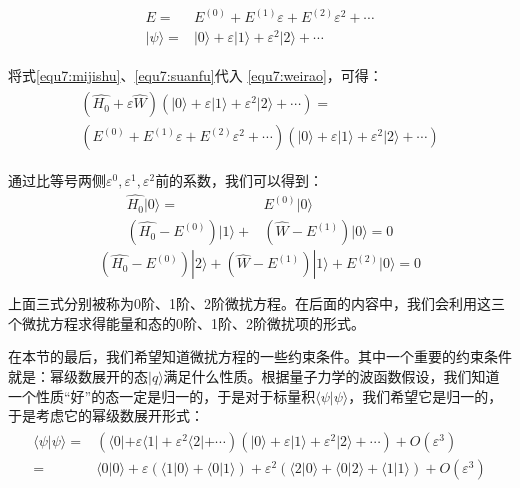     \begin{align} \label{equ7:mijishu}
        \begin{split}
            E=& E^{(0)}+E^{(1)}\varepsilon+E^{(2)}\varepsilon^2+\cdots\\
            |\psi\rangle=&|0\rangle+\varepsilon|1\rangle+\varepsilon^2|2\rangle+\cdots
        \end{split}
    \end{align}
    
    将式\eqref{equ7:mijishu}、\eqref{equ7:suanfu}代入 \eqref{equ7:weirao}，可得：
        \begin{align}
            \begin{split}
                (\hat{H_0}+\varepsilon\hat{W})(|0\rangle+\varepsilon|1\rangle+\varepsilon^2|2\rangle+\cdots) =\\
                (E^{(0)}+E^{(1)}\varepsilon+E^{(2)}\varepsilon^2+\cdots) (|0\rangle+\varepsilon|1\rangle+\varepsilon^2|2\rangle+\cdots)
            \end{split}
        \end{align}
        
    通过比等号两侧$\varepsilon^0,\varepsilon^1,\varepsilon^2$前的系数，我们可以得到：
            \begin{align}\label{equ:0thpert}
                \hat{H_0}|0\rangle=&E^{(0)}|0\rangle\\ 
            (\hat{H_0}-E^{(0)})|1\rangle+&(\hat{W}-E^{(1)})|0\rangle=0  \label{equ:1stpert}
            \end{align} 
            \begin{equation}
                (\hat{H_0}-E^{(0)})|2\rangle+(\hat{W}-E^{(1)})|1\rangle+E^{(2)}|0\rangle=0 \label{equ:2ndpert}
            \end{equation}
            
            上面三式分别被称为0阶、1阶、2阶微扰方程。在后面的内容中，我们会利用这三个微扰方程求得能量和态的0阶、1阶、2阶微扰项的形式。
            
            在本节的最后，我们希望知道微扰方程的一些约束条件。其中一个重要的约束条件就是：幂级数展开的态$|q\rangle$满足什么性质。根据量子力学的波函数假设，我们知道一个性质“好”的态一定是归一的，于是对于标量积$\langle \psi|\psi \rangle$，我们希望它是归一的，于是考虑它的幂级数展开形式：
            \begin{align}
                 \begin{split}
                     \langle \psi|\psi \rangle=&(\langle0|+\varepsilon\langle1|+\varepsilon^2\langle2|+\cdots)(|0\rangle+\varepsilon|1\rangle+\varepsilon^2|2\rangle+\cdots)+O(\varepsilon^3)\\
                    =&\langle0|0\rangle+\varepsilon(\langle1|0\rangle+\langle0|1\rangle)+\varepsilon^2(\langle2|0\rangle+\langle0|2\rangle+\langle1|1\rangle)+O(\varepsilon^3)
                 \end{split}
            \end{align}
           
